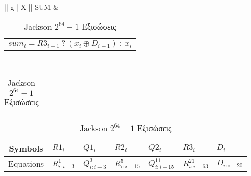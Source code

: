 \begin{table}[H]
\begin{tabularx}{\textwidth}{|| g | X ||}
        SUM   & 
        \begin{tabular}{@{}c@{}}$ sum_i = R3_{i-1}\ ?\ (x_i \oplus D_{i-1})\ :\ x_i$
        \end{tabular}\\\hline
    \end{tabularx}
    

    
    \begin{tabularx}{\textwidth}{X} 
    \\
    \end{tabularx}  
    
    
    \begin{tabularx}{\textwidth}{| c | X X X X X X | } 
        \hline%
        Symbols & $R1_i$ & $Q1_i$ & $R2_i$ & $Q2_i$ & $R3_i$ & $D_i$ \\
        \hline%
        Equations & $R^1_{i:i-3}$ & $Q^3_{i:i-3}$ & $R^5_{i:i-15}$ & $Q^{11}_{i:i-15}$ 
        & $R^{21}_{i:i-63}$ & $ D_{i:i-20}$ \\
        \hline
    \end{tabularx}
    
\caption{Jackson $2^{64}-1$ Εξισώσεις}
\end{table}


















%




